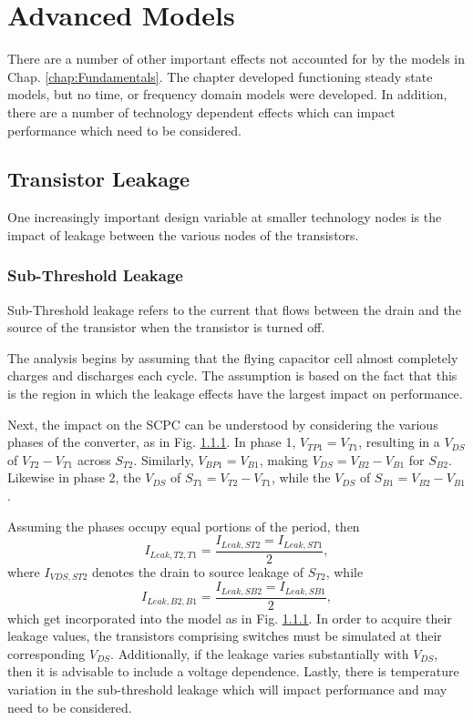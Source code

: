 \chapter{Advanced Models}
There are a number of other important effects not accounted for by the models in Chap. \ref{chap:Fundamentals}. The chapter developed functioning steady state models, but no time, or frequency domain models were developed. In addition, there are a number of technology dependent effects which can impact performance which need to be considered.
\section{Transistor Leakage}
One increasingly important design variable at smaller technology nodes is the impact of leakage between the various nodes of the transistors.
\subsection{Sub-Threshold Leakage}
Sub-Threshold leakage refers to the current that flows between the drain and the source of the transistor when the transistor is turned off. 

The analysis begins by assuming that the flying capacitor cell almost completely charges and discharges each cycle. The assumption is based on the fact that this is the region in which the leakage effects have the largest impact on performance.

Next, the impact on the SCPC can be understood by considering the various phases of the converter, as in Fig. \ref{}. In phase 1, $V_{TP1} = V_{T1}$, resulting in a $V_{DS}$ of $V_{T2} - V_{T1}$ across $S_{T2}$. Similarly, $V_{BP1} = V_{B1}$, making $V_{DS} = V_{B2} - V_{B1}$ for $S_{B2}$. Likewise in phase 2, the $V_{DS}$ of $S_{T1} = V_{T2} - V_{T1}$, while the $V_{DS}$ of $S_{B1} = V_{B2} - V_{B1}$. 

Assuming the phases occupy equal portions of the period, then 
\begin{equation}
	I_{Leak,T2,T1} = \frac{I_{Leak,ST2} = I_{Leak,ST1}}{2},
\end{equation}
where $I_{VDS,ST2}$ denotes the drain to source leakage of $S_{T2}$, while 
\begin{equation}
	I_{Leak,B2,B1} = \frac{I_{Leak,SB2} = I_{Leak,SB1}}{2},
\end{equation}
which get incorporated into the model as in Fig. \ref{}. In order to acquire their leakage values, the transistors comprising switches must be simulated at their corresponding $V_{DS}$. Additionally, if the leakage varies substantially with $V_{DS}$, then it is advisable to include a voltage dependence. Lastly, there is temperature variation in the sub-threshold leakage which will impact performance and may need to be considered.

